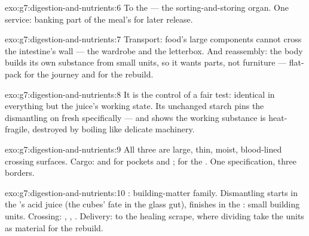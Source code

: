 \begin{solution}{exo:g7:digestion-and-nutrients:6}
To the  --- the sorting-and-storing organ. One
service: banking part of the meal's  for later
release.
\end{solution}

\begin{solution}{exo:g7:digestion-and-nutrients:7}
Transport: food's large components cannot cross the
intestine's wall --- the wardrobe and the letterbox. And
reassembly: the body builds its own substance from small
units, so it wants parts, not furniture --- flat-pack for
the journey and for the rebuild.
\end{solution}

\begin{solution}{exo:g7:digestion-and-nutrients:8}
It is the control of a fair test: identical in
everything but the juice's working state. Its unchanged
starch pins the dismantling on fresh  specifically
--- and shows the working substance is heat-fragile,
destroyed by boiling like delicate machinery.
\end{solution}

\begin{solution}{exo:g7:digestion-and-nutrients:9}
All three are large, thin, moist, blood-lined crossing
surfaces. Cargo:  and  for 
pockets and  ;  for the . One
specification, three borders.
\end{solution}

\begin{solution}{exo:g7:digestion-and-nutrients:10}
: building-matter family. Dismantling starts in the
's acid juice (the cubes' fate in the glass gut),
finishes in the : small building units.
Crossing: , , . Delivery: to the healing
scrape, where dividing   take the units as
material for the rebuild.
\end{solution}

